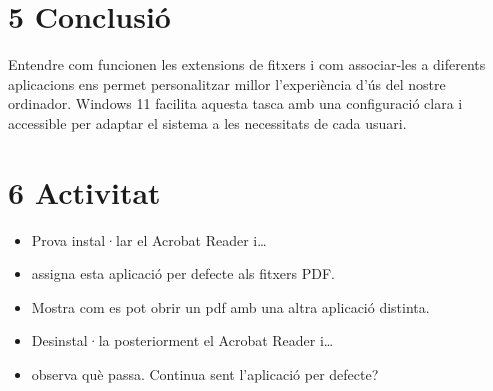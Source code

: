 \documentclass[
  a4paper,
]{article}
\providecommand{\tightlist}{%
  \setlength{\itemsep}{0pt}\setlength{\parskip}{0pt}}
\begin{document}
\section{5 Conclusió}\label{conclusiuxf3}

Entendre com funcionen les extensions de fitxers i com associar-les a
diferents aplicacions ens permet personalitzar millor l'experiència d'ús
del nostre ordinador. Windows 11 facilita aquesta tasca amb una
configuració clara i accessible per adaptar el sistema a les necessitats
de cada usuari.

\section{6 Activitat}\label{activitat}

\begin{itemize}
\tightlist
\item
  Prova instal·lar el Acrobat Reader i\ldots{}
\item
  assigna esta aplicació per defecte als fitxers PDF.
\item
  Mostra com es pot obrir un pdf amb una altra aplicació distinta.
\item
  Desinstal·la posteriorment el Acrobat Reader i\ldots{}
\item
  observa què passa. Continua sent l'aplicació per defecte?
\end{itemize}
\end{document}
